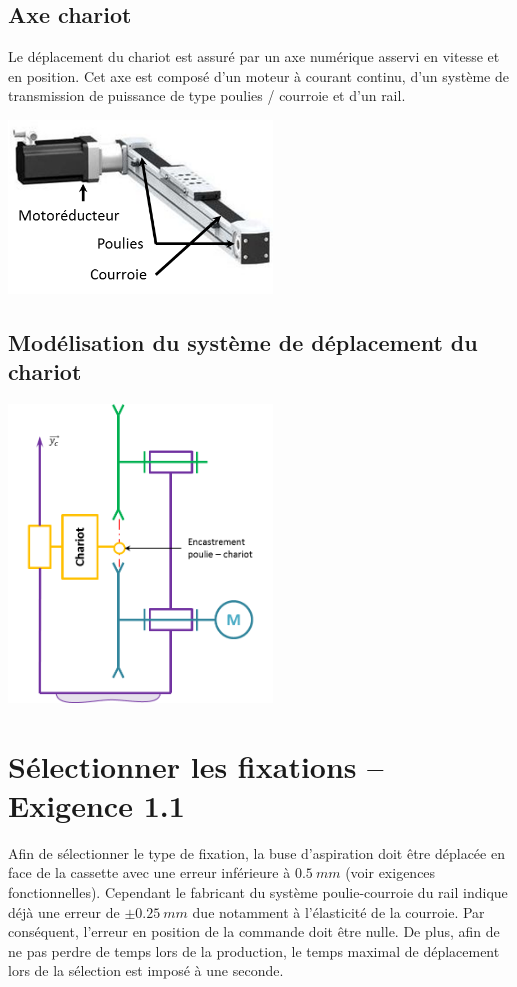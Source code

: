 \documentclass[10pt,fleqn]{article} %
\begin{document}
 
\subsection*{Axe chariot}
Le déplacement du chariot est assuré par un axe numérique asservi en vitesse et en position. Cet axe est composé d’un moteur à courant continu, d’un système de transmission de puissance de type poulies / courroie et d’un rail.
 
\begin{center}
\includegraphics[width=7cm]{images/image7}
\end{center} 


\subsection*{Modélisation du système de déplacement du chariot}

\begin{center}
\includegraphics[width=7cm]{images/image8}
\end{center} 







\section*{Sélectionner les fixations – Exigence 1.1}
Afin de sélectionner le type de fixation, la buse d’aspiration doit être déplacée en face de la cassette avec une erreur inférieure à $\SI{0,5}{mm}$ (voir exigences fonctionnelles). Cependant le fabricant du système poulie-courroie du rail indique déjà une erreur de $\pm \SI{0,25}{mm}$ due notamment à l’élasticité de la courroie. Par conséquent, l’erreur en position de la commande doit être nulle. De plus, afin de ne pas perdre de temps lors de la production, le temps maximal de déplacement lors de la sélection est imposé à une seconde.
\end{document}
